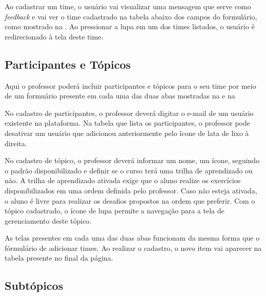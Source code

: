 
Ao cadastrar um time, o usuário vai visualizar uma mensagem que serve como \textit{feedback} e vai ver o time cadastrado na tabela abaixo dos campos do formulário, como mostrado na . Ao pressionar a lupa em um dos times listados, o usuário é redirecionado à tela deste time.

\subsection{Participantes e Tópicos}

Aqui o professor poderá incluir participantes e tópicos para o seu time por meio de um formuário presente em cada uma das duas abas mostradas na  e na  


No cadastro de participantes, o professor deverá digitar o e-mail de um usuário existente na plataforma. Na tabela que lista os participantes, o professor pode desativar um usuário que adicionou anteriormente pelo ícone de lata de lixo à direita.


No cadastro de tópico, o professor deverá informar um nome, um ícone, seguindo o padrão disponibilizado e definir se o curso terá uma trilha de aprendizado ou não. A trilha de aprendizado ativada exige que o aluno realize os exercícios disponibilizados em uma ordem definida pelo professor. Caso não esteja ativada, o aluno é livre para realizar os desafios propostos na ordem que preferir. Com o tópico cadastrado, o ícone de lupa permite a navegação para a tela de gerenciamento deste tópico.

As telas presentes em cada uma das duas abas funcionam da mesma forma que o fórmulário de adicionar times. Ao realizar o cadastro, o novo item vai aparecer na tabela presente no final da página.

\subsection{Subtópicos}


